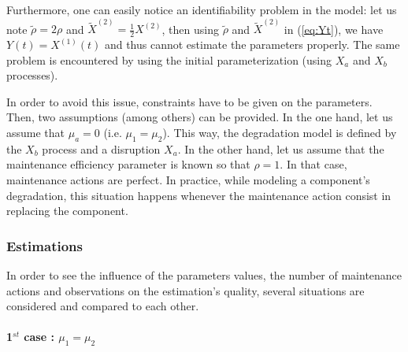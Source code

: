 

Furthermore, one can easily notice an identifiability problem in the model: let us note $\tilde \rho= 2 \rho$ and $\tilde X^{(2)}=\frac{1}{2}X^{(2)}$, then using $\tilde \rho$ and $\tilde X^{(2)}$ in (\ref{eq:Yt}), we have $Y(t)=X^{(1)}(t)$ and thus cannot estimate the parameters properly.  The same problem is encountered by using the initial parameterization (using $X_a$ and $X_b$ processes).

\noindent In order to avoid this issue, constraints have to be given on the parameters. Then, two assumptions (among others) can be provided. In the one hand, let us assume that $\mu_a=0$ (i.e. $\mu_1=\mu_2$). This way, the degradation model is defined by the $X_b$ process and a disruption $X_a$. In the other hand, let us assume that the maintenance efficiency parameter is known so that $\rho=1$. In that case, maintenance actions are perfect. In practice, while modeling a component's degradation, this situation happens whenever the maintenance action consist in replacing the component.

\subsubsection{ Estimations }

In order to see the influence of the parameters values, the number of maintenance actions and observations on the estimation's quality, several situations are considered and compared to each other.

\paragraph{1$^{st}$ case : $\mu_1=\mu_2$}
~~\\

